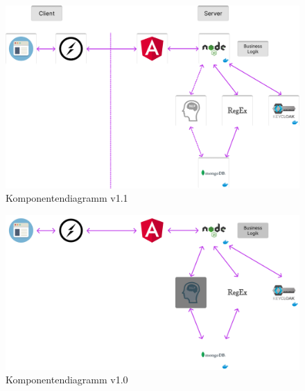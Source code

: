 \begin{figure}
\centering
\includegraphics[width=1.0\textwidth]{bilder/technologien/Komponentendiagram v1.1.png}
\caption{Komponentendiagramm v1.1}
\label{fig:Komponentendiagramm_v1.1}
\end{figure}

\begin{figure}
\centering
\includegraphics[width=1.0\textwidth]{bilder/technologien/Komponenten-Diagram-v1.png}
\caption{Komponentendiagramm v1.0}
\label{fig:Komponentendiagramm_v1.0}
\end{figure}
\FloatBarrier %